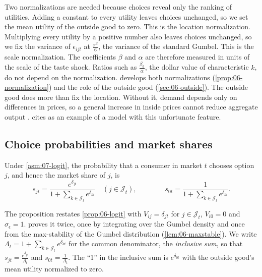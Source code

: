 Two normalizations are needed because choices reveal only the ranking of utilities. Adding a constant to
every utility leaves choices unchanged, so we set the mean utility of the outside good to zero. This is the
location normalization. Multiplying every utility by a positive number also leaves choices unchanged, so we
fix the variance of $\epsilon_{ijt}$ at $\frac{\pi^2}{6}$, the variance of the standard Gumbel. This is the
scale normalization. The coefficients $\beta$ and $\alpha$ are therefore measured in units of the scale of
the taste shock. Ratios such as $\frac{\beta_k}{\alpha}$, the dollar value of characteristic $k$, do not depend
on the normalization.  develops both normalizations (\cref{prop:06-normalization}) and the
role of the outside good (\cref{sec:06-outside}). The outside good does more than fix the location. Without
it, demand depends only on differences in prices, so a general increase in inside prices cannot reduce
aggregate output \citep[p.~247]{Berry1994}. \citet{Berry1994} cites \citet{MorrisonWinston1986} as an example of
a model with this unfortunate feature.

\subsection{Choice probabilities and market shares}\label{sec:07-logit-shares}

\begin{proposition}\label{prop:07-logit-shares}
Under \cref{asm:07-logit}, the probability that a consumer in market $t$ chooses option $j$, and hence the
market share of $j$, is
\begin{equation}\label{eq:07-logit-share}
  s_{jt} = \frac{e^{\delta_{jt}}}{1 + \sum_{k \in \mathcal{J}_t} e^{\delta_{kt}}} \quad (j \in \mathcal{J}_t),
  \qquad\qquad
  s_{0t} = \frac{1}{1 + \sum_{k \in \mathcal{J}_t} e^{\delta_{kt}}} .
\end{equation}
\end{proposition}

The proposition restates \cref{prop:06-logit} with $V_{ij} = \delta_{jt}$ for $j \in \mathcal{J}_t$, $V_{i0} = 0$
and $\sigma_\epsilon = 1$.  proves it twice, once by integrating over the Gumbel density and
once from the max-stability of the Gumbel distribution (\cref{lem:06-maxstable}). We write
$\Lambda_t = 1 + \sum_{k \in \mathcal{J}_t} e^{\delta_{kt}}$ for the common denominator, the \emph{inclusive sum}, so
that $s_{jt} = \frac{e^{\delta_{jt}}}{\Lambda_t}$ and $s_{0t} = \frac{1}{\Lambda_t}$. The ``1'' in the inclusive sum is
$e^{\delta_{0t}}$ with the outside good's mean utility normalized to zero.

